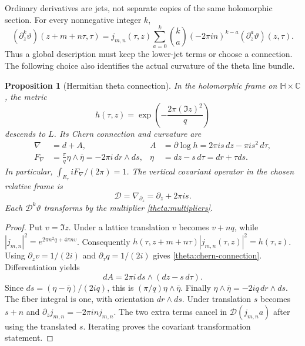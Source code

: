 \documentclass[11pt]{article}
\numberwithin{equation}{section}
\newtheorem{proposition}[theorem]{Proposition}
\theoremstyle{definition}
\theoremstyle{remark}
\begin{document}
Ordinary derivatives are jets, not separate copies of the same
holomorphic section.  For every nonnegative integer $k$,
\begin{equation}
 (\partial_z^k\vartheta)(z+m+n\tau,\tau)
 =j_{m,n}(\tau,z)
   \sum_{a=0}^k\binom ka(-2\pi in)^{k-a}
                          (\partial_z^a\vartheta)(z,\tau).
 \label{theta:jet-automorphy}
\end{equation}
Thus a global description must keep the lower-jet terms or choose a
connection.  The following choice also identifies the actual curvature
of the theta line bundle.

\begin{proposition}[Hermitian theta connection]
\label{theta:chern}
In the holomorphic frame on $\mathbb H\times\mathbb C$, the metric
\begin{equation}
 h(\tau,z)=\exp\!\left(-\frac{2\pi(\Im z)^2}{q}\right)
 \label{theta:Hermitian-metric}
\end{equation}
descends to $L$.  Its Chern connection and curvature are
\begin{align}
 \nabla&=d+A, & A&=\partial\log h
                  =2\pi i s\,dz-\pi i s^2\,d\tau,
                  \label{theta:chern-connection}\\
 F_\nabla&=\frac\pi q\eta\wedge\overline\eta
                 =-2\pi i\,dr\wedge ds,
 &\eta&=dz-s\,d\tau=dr+\tau ds.
 \label{theta:chern-curvature}
\end{align}
In particular, $\int_{E_\tau}iF_\nabla/(2\pi)=1$.
The vertical covariant operator in the chosen relative frame is
\begin{equation}
 \mathcal D=\nabla_{\partial_z}=\partial_z+2\pi i s.
 \label{theta:vertical-operator}
\end{equation}
Each $\mathcal D^k\vartheta$ transforms by the multiplier
\eqref{theta:multipliers}.
\end{proposition}

\begin{proof}
Put $v=\Im z$.  Under a lattice translation $v$ becomes $v+nq$, while
$|j_{m,n}|^2=e^{2\pi n^2q+4\pi nv}$.  Consequently
$h(\tau,z+m+n\tau)|j_{m,n}(\tau,z)|^2=h(\tau,z)$.
Using $\partial_z v=1/(2i)$ and $\partial_\tau q=1/(2i)$ gives
\eqref{theta:chern-connection}.  Differentiation yields
\[
 dA=2\pi i\,ds\wedge(dz-s\,d\tau).
\]
Since
$ds=(\eta-\overline\eta)/(2iq)$, this is
$(\pi/q)\eta\wedge\overline\eta$.  Finally
$\eta\wedge\overline\eta=-2iq\,dr\wedge ds$.
The fiber integral is one, with orientation $dr\wedge ds$.
Under translation $s$ becomes $s+n$ and
$\partial_z j_{m,n}=-2\pi in j_{m,n}$.  The two extra terms cancel in
$\mathcal D(j_{m,n}a)$ after using the translated $s$.  Iterating proves
the covariant transformation statement.
\end{proof}
\end{document}

